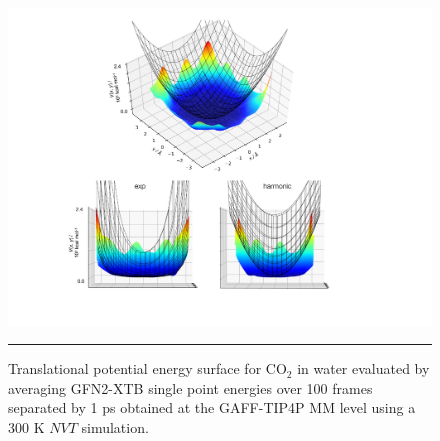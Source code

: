 \documentclass[../main.tex]{subfiles}
\begin{document}
\begin{figure}[h!]
	\vspace{0.2cm}
	\centering
	\includegraphics[width=14.5cm]{4/figs/figX4/figX4.pdf}
	\vspace{0.2cm}
	\hrule
	\caption{Translational potential energy surface for CO$_2$ in water evaluated by averaging GFN2-XTB single point energies over 100 frames separated by 1 ps obtained at the GAFF-TIP4P MM level using a 300 K $NVT$ simulation.} 
	\label{fig::2d_co2_in_h2o_mm_xtb}
\end{figure}

\end{document}
